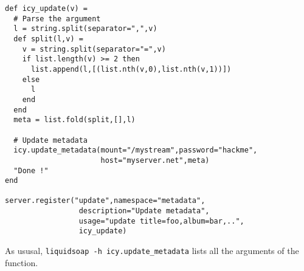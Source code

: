 \begin{verbatim}
def icy_update(v) =
  # Parse the argument
  l = string.split(separator=",",v)
  def split(l,v) =
    v = string.split(separator="=",v)
    if list.length(v) >= 2 then
      list.append(l,[(list.nth(v,0),list.nth(v,1))])
    else
      l
    end
  end
  meta = list.fold(split,[],l)

  # Update metadata
  icy.update_metadata(mount="/mystream",password="hackme",
                      host="myserver.net",meta)
  "Done !"
end

server.register("update",namespace="metadata",
                 description="Update metadata",
                 usage="update title=foo,album=bar,..",
                 icy_update)
\end{verbatim}
As ususal, \verb+liquidsoap -h icy.update_metadata+ lists all the arguments
of the function.

